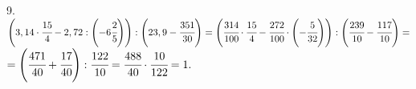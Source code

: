 9. $\left(3,14\cdot\cfrac{15}{4}-2,72:\left(-6\cfrac{2}{5}\right)\right):\left(23,9-\cfrac{351}{30}\right)=
\left(\cfrac{314}{100}\cdot\cfrac{15}{4}-\cfrac{272}{100}\cdot\left(-\cfrac{5}{32}\right)\right):\left(\cfrac{239}{10}-\cfrac{117}{10}\right)=$\\
$=\left(\cfrac{471}{40}+\cfrac{17}{40}\right):\cfrac{122}{10}=\cfrac{488}{40}\cdot\cfrac{10}{122}=1.$\\
